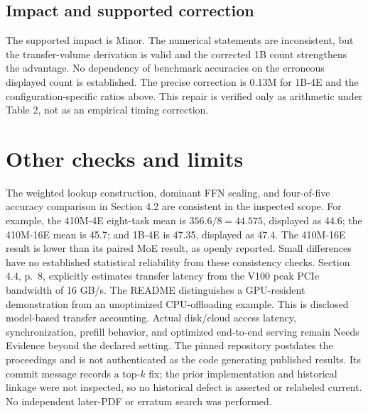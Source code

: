 \documentclass[10pt]{article}
\begin{document}
\subsection*{Impact and supported correction}
The supported impact is Minor. The numerical statements are inconsistent, but the transfer-volume derivation is valid and the corrected 1B count strengthens the advantage. No dependency of benchmark accuracies on the erroneous displayed count is established. The precise correction is 0.13M for 1B-4E and the configuration-specific ratios above. This repair is verified only as arithmetic under Table 2, not as an empirical timing correction.\par
\section*{Other checks and limits}
The weighted lookup construction, dominant FFN scaling, and four-of-five accuracy comparison in Section 4.2 are consistent in the inspected scope. For example, the 410M-4E eight-task mean is \(356.6/8=44.575\), displayed as 44.6; the 410M-16E mean is 45.7; and 1B-4E is 47.35, displayed as 47.4. The 410M-16E result is lower than its paired MoE result, as openly reported. Small differences have no established statistical reliability from these consistency checks. Section 4.4, p. 8, explicitly estimates transfer latency from the V100 peak PCIe bandwidth of 16 GB/s. The README distinguishes a GPU-resident demonstration from an unoptimized CPU-offloading example. This is disclosed model-based transfer accounting. Actual disk/cloud access latency, synchronization, prefill behavior, and optimized end-to-end serving remain Needs Evidence beyond the declared setting. The pinned repository postdates the proceedings and is not authenticated as the code generating published results. Its commit message records a top-\(k\) fix; the prior implementation and historical linkage were not inspected, so no historical defect is asserted or relabeled current. No independent later-PDF or erratum search was performed.\par
\end{document}
